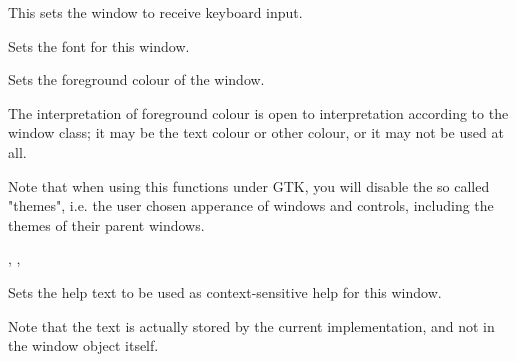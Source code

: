 \label{wxwindowsetfocus}


This sets the window to receive keyboard input.

\label{wxwindowsetfont}


Sets the font for this window.





\label{wxwindowsetforegroundcolour}


Sets the foreground colour of the window.




The interpretation of foreground colour is open to interpretation according
to the window class; it may be the text colour or other colour, or it may not
be used at all.

Note that when using this functions under GTK, you will disable the so called "themes",
i.e. the user chosen apperance of windows and controls, including the themes of
their parent windows.


,\rtfsp
{},\rtfsp
{}

\label{wxwindowsethelptext}


Sets the help text to be used as context-sensitive help for this window.

Note that the text is actually stored by the current  implementation,
and not in the window object itself.

